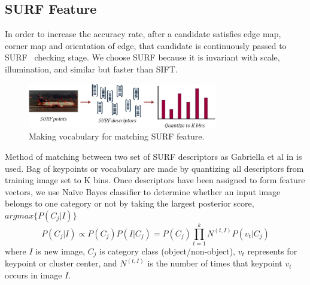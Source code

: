 \subsection{SURF Feature}
In order to increase the accuracy rate, after a candidate satisfies edge
map, corner map and orientation of edge, that candidate is continuously
passed to SURF~\cite{bay2008surf} checking stage. We choose SURF because it
is invariant with scale, illumination, and similar but faster than SIFT.
\begin{figure}[ht]
  \centering
  \includegraphics[width=3.25in]{images/surf.jpg}
  \caption{Making vocabulary for matching SURF feature.}
  \label{fig:making_surf}
\end{figure}
Method of matching between two set of SURF descriptors as
Gabriella et al in\cite{lazebnik2006beyond,csurka2004visual} is used. Bag of keypoints or vocabulary
are made by quantizing all descriptors from training image set to K
bins. Once descriptors have been assigned to form feature vectors,
we use Naïve Bayes classifier to determine whether an input image
belongs to one category or not by taking the largest posterior score,
$argmax\{P(C_j|I)\}$
\begin{equation}
   P(C_j|I) \propto P(C_j)P(I|C_j)= P(C_j)\prod_{t=1}^{k} N^{(t,I)} P(v_t|C_j)
   \label{eq:surf}
\end{equation}
where $I$ is new image, $C_j$ is category class (object/non-object), $v_t$
represents for keypoint or cluster center, and $N^{(t,I)}$ is the number of
times that keypoint $v_t$ occurs in image $I$.
